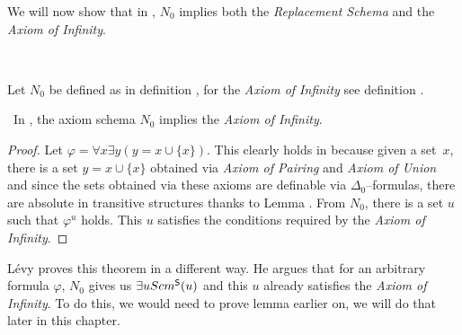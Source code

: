 We will now show that in , $N_0$ implies both the \emph{Replacement Schema} and the \emph{Axiom of Infinity}.

\

Let $N_0$ be defined as in definition , for the \emph{Axiom of Infinity} see definition .
\begin{theorem}\label{theorem:n0_implies_infinity}\
In , the axiom schema $N_0$ implies the \emph{Axiom of Infinity}.
\end{theorem}

\begin{proof} %
Let $\varphi = \forall x \exists y (y = x \cup \{x\})$. 
This clearly holds in  because given a set~$x$, there is a set $y = x \cup \{x\}$ obtained via \emph{Axiom of Pairing} and \emph{Axiom of Union} and since the sets obtained via these axioms are definable via $\Delta_0$–formulas, there are absolute in transitive structures thanks to Lemma . %
From $N_0$, there is a set $u$ such that $\varphi^{u}$ holds. %
 This $u$ satisfies the conditions required by the \emph{Axiom of Infinity}.
\end{proof}

Lévy proves this theorem in a different way. He argues that for an arbitrary formula $\varphi$, $N_0$ gives us $\exists u Scm^{\sf{S}}(u)$ and this $u$ already satisfies the \emph{Axiom of Infinity}. 
To do this, we would need to prove lemma \bref{lemma:scm_s_is_limit} earlier on, we will do that later in this chapter.

\

